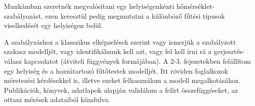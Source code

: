 



Munkámban szeretnék megvalósítani egy helyiségenkénti hőmérséklet-szabályozást, ezen keresztül pedig megmutatni a különböző fűtési típusok viselkedését egy helyiségen belül.


A szabályzáshoz a klasszikus elképzelések szerint vagy ismerjük a szabályzott szakasz modelljét, vagy identifikálnunk kell azt, vagy fel kell írni rá a gerjesztés-válasz kapcsolatot (átviteli függvények formájában). 
%
A 2-3. fejezetekben felállítom egy helyiség és a hozzátartozó fűtőtestek modelljét. Itt röviden foglalkozok méretezési kérdésekkel is, illetve ezeket felhasználom a modell megalkotásához. Publikációk, könyvek, adatlapok alapján validálom a felírt összefüggéseket, az ottani mérések adataiból kiindulva. 


%
%
%





